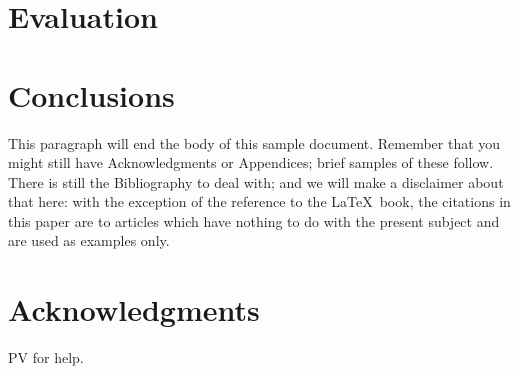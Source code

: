 \documentclass{acm_proc_article-sp}
\begin{document}
\section{Evaluation}


\section{Conclusions}
This paragraph will end the body of this sample document.
Remember that you might still have Acknowledgments or
Appendices; brief samples of these
follow.  There is still the Bibliography to deal with; and
we will make a disclaimer about that here: with the exception
of the reference to the \LaTeX\ book, the citations in
this paper are to articles which have nothing to
do with the present subject and are used as
examples only.

\section{Acknowledgments}
PV for help.

%

%
%
\balancecolumns
\end{document}
